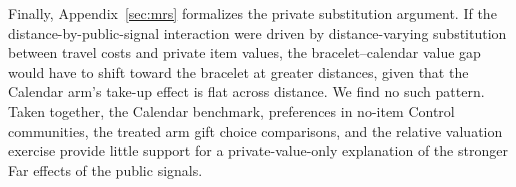 \documentclass[ECM\space ReStud.tex]{subfiles}
\begin{document}
Finally, Appendix~\ref{sec:mrs} formalizes the private substitution argument. If the distance-by-public-signal interaction were driven by distance-varying substitution between travel costs and private item values, the bracelet--calendar value gap would have to shift toward the bracelet at greater distances, given that the Calendar arm's take-up effect is flat across distance. We find no such pattern. Taken together, the Calendar benchmark, preferences in no-item Control communities, the treated arm gift choice comparisons, and the relative valuation exercise provide little support for a private-value-only explanation of the stronger Far effects of the public signals.

\end{document}
